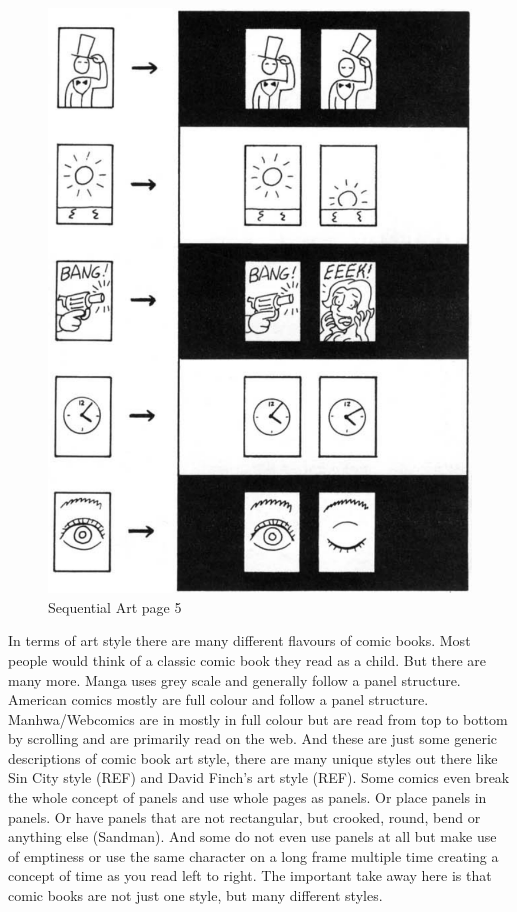 \begin{figure}[!htp]
	\centering
	\includegraphics[scale=0.45]{images/SequentalArtUnderstandingComicPage5.png}
	\caption[Sequential Art]{Sequential Art page 5 \cite{mccloud1993understanding}}
	\label{fig:SequentialArt}
\end{figure}

In terms of art style there are many different flavours of comic books. Most people would think of a classic comic book they read as a child. But there are many more. Manga uses grey scale and generally follow a panel structure. American comics mostly are full colour and follow a panel structure. Manhwa/Webcomics are in mostly in full colour but are read from top to bottom by scrolling and are primarily read on the web. And these are just some generic descriptions of comic book art style, there are many unique styles out there like Sin City style (REF) and David Finch's art style (REF). Some comics even break the whole concept of panels and use whole pages as panels. Or place panels in panels. Or have panels that are not rectangular, but crooked, round, bend or anything else (Sandman). And some do not even use panels at all but make use of emptiness or use the same character on a long frame multiple time creating a concept of time as you read left to right. The important take away here is that comic books are not just one style, but many different styles.

